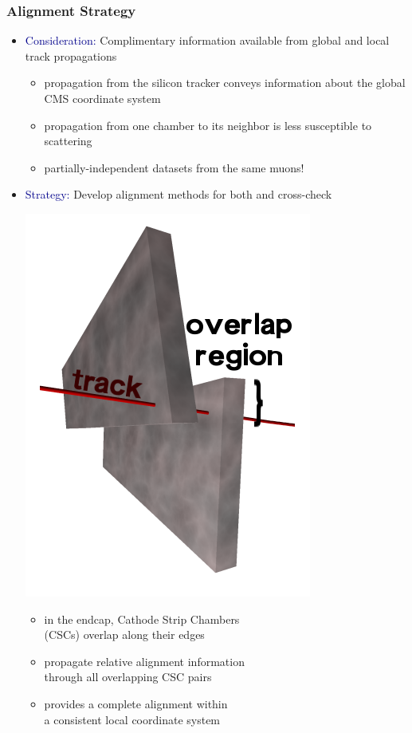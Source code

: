 \documentclass[compress]{beamer}
\begin{document}
\begin{frame}
\frametitle{Alignment Strategy}

\begin{itemize}\setlength{\itemsep}{0.25 cm}
\item \textcolor{darkblue}{Consideration:} Complimentary information available from global and local track propagations
\begin{itemize}\setlength{\itemsep}{0.2 cm}
\item propagation from the silicon tracker conveys information about the global CMS coordinate system
\item propagation from one chamber to its neighbor is less susceptible to scattering
\item partially-independent datasets from the same muons!
\end{itemize}

\item \textcolor{darkblue}{Strategy:} Develop alignment methods for both and cross-check

\hfill \includegraphics[height=3 cm]{overlaps.png}
\vspace{-3.3 cm}

\begin{itemize}\setlength{\itemsep}{0.2 cm}
\item in the endcap, Cathode Strip Chambers \\ (CSCs) overlap along their edges
\item propagate relative alignment information \\ through all overlapping CSC pairs
\item provides a complete alignment within \\ a consistent local coordinate system
\end{itemize}
\end{itemize}
\end{frame}
\end{document}
